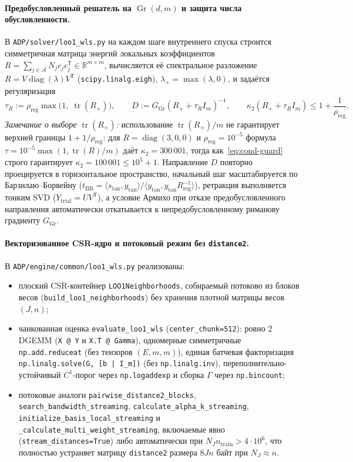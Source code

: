 \documentclass[11pt,a4paper]{article}
\numberwithin{equation}{section}
\theoremstyle{definition}
\theoremstyle{remark}
\newcommand{\R}{\mathbb{R}}
\newcommand{\tr}{\operatorname{tr}}
\newcommand{\diag}{\operatorname{diag}}
\newcommand{\Gr}{\operatorname{Gr}}
\newcommand{\T}{^{\mathsf T}}
\newcommand{\code}[1]{\nolinkurl{#1}}
\begin{document}
\paragraph{Предобусловленный решатель на $\Gr(d,m)$ и защита числа обусловленности.}
В \code{ADP/solver/loo1_wls.py} на каждом шаге внутреннего спуска строится симметричная матрица
энергий локальных коэффициентов $R = \sum_{j \in \mathcal{A}} N_j c_j c_j\T \in \R^{m \times m}$,
вычисляется её спектральное разложение $R = V \diag(\lambda) V\T$ (\code{scipy.linalg.eigh}),
$\lambda_+ = \max(\lambda, 0)$, и задаётся регуляризация
\begin{equation}\label{eq:cond-guard}
  \tau_R := \rho_{\mathrm{reg}} \max\!\bigl(1,\; \tr(R_+)\bigr), \qquad
  D := G_{\Gr} (R_+ + \tau_R I_m)^{-1}, \qquad
  \kappa_2(R_+ + \tau_R I_m) \le 1 + \frac{1}{\rho_{\mathrm{reg}}}.
\end{equation}
\emph{Замечание о выборе $\tr(R_+)$:} использование $\tr(R_+)/m$ не гарантирует верхней границы $1 + 1/\rho_{\mathrm{reg}}$:
для $R = \diag(3,0,0)$ и $\rho_{\mathrm{reg}} = 10^{-5}$ формула $\tau = 10^{-5}\max(1, \tr(R)/m)$ даёт
$\kappa_2 = 300\,001$, тогда как~\eqref{eq:cond-guard} строго гарантирует $\kappa_2 = 100\,001 \le 10^5 + 1$.
Направление $D$ повторно проецируется в горизонтальное пространство, начальный шаг масштабируется по
Барзилаю--Борвейну ($t_{\mathrm{BB}} = \langle s_{\mathrm{tan}}, y_{\mathrm{tan}} \rangle / \langle y_{\mathrm{tan}}, y_{\mathrm{tan}} R_{\mathrm{reg}}^{-1} \rangle$),
ретракция выполняется тонким SVD ($Y_{\mathrm{trial}} = U V\T$), а условие Армихо при отказе предобусловленного
направления автоматически откатывается к непредобусловленному риманову градиенту $G_{\Gr}$.

\paragraph{Векторизованное CSR-ядро и потоковый режим без \code{distance2}.}
В \code{ADP/engine/common/loo1_wls.py} реализованы:
\begin{itemize}
  \item плоский CSR-контейнер \code{LOO1Neighborhoods}, собираемый потоково из блоков весов
  (\code{build_loo1_neighborhoods}) без хранения плотной матрицы весов $(J, n)$;
  \item чанкованная оценка \code{evaluate_loo1_wls} (\code{center_chunk=512}): ровно 2 DGEMM
  (\code{X @ Y} и \code{X.T @ Gamma}), одномерные симметричные \code{np.add.reduceat}
  (без тензоров $(E, m, m)$), единая батчевая факторизация \code{np.linalg.solve(G, [b | I_m])}
  (без \code{np.linalg.inv}), переполнительно-устойчивый $C^1$-порог через \code{np.logaddexp}
  и сборка $\Gamma$ через \code{np.bincount};
  \item потоковые аналоги \code{pairwise_distance2_blocks}, \code{search_bandwidth_streaming},
  \code{calculate_alpha_k_streaming}, \code{initialize_basis_local_streaming} и
  \code{_calculate_multi_weight_streaming}, включаемые явно (\code{stream_distances=True})
  либо автоматически при $N_J n_{\mathrm{train}} > 4 \cdot 10^6$, что полностью устраняет
  матрицу \code{distance2} размера $8 J n$ байт при $N_J \approx n$.
\end{itemize}
\end{document}
